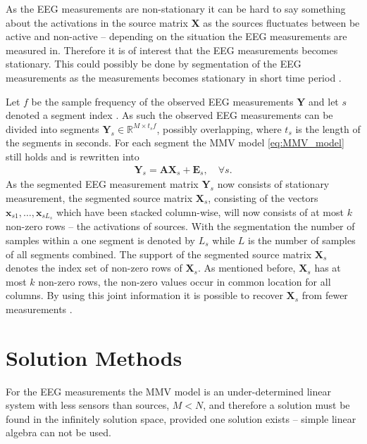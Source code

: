 As the EEG measurements are non-stationary it can be hard to say something about the activations in the source matrix $\mathbf{X}$ as the sources fluctuates between be active and non-active -- depending on the situation the EEG measurements are measured in.
Therefore it is of interest that the EEG measurements becomes stationary.
This could possibly be done by segmentation of the EEG measurements as the measurements becomes stationary in short time period .

Let $f$ be the sample frequency of the observed EEG measurements $\mathbf{Y}$ and let $s$ denoted a segment index .
As such the observed EEG measurements can be divided into segments $\mathbf{Y}_s \in \mathbb{R}^{M \times t_s f}$, possibly overlapping, where $t_s$ is the length of the segments in seconds. For each segment the MMV model \eqref{eq:MMV_model} still holds and is rewritten into
\begin{align}\label{eq:MMV_seg}
\mathbf{Y}_s = \mathbf{AX}_s + \textbf{E}_s, \quad \forall s.
\end{align}
As the segmented EEG measurement matrix $\mathbf{Y}_s$ now consists of stationary measurement, the segmented source matrix $\mathbf{X}_s$, consisting of the vectors $\mathbf{x}_{s1}, \dots, \mathbf{x}_{sL_s}$ which have been stacked column-wise, will now consists of at most $k$ non-zero rows -- the activations of sources. With the segmentation the number of samples within a one segment is denoted by $L_s$ while $L$ is the number of samples of all segments combined. 
The support of the segmented source matrix $\mathbf{X}_s$ denotes the index set of non-zero rows of $\mathbf{X}_s$. 
As mentioned before, $\mathbf{X}_s$ has at most $k$ non-zero rows, the non-zero values occur in common location for all columns. 
By using this joint information it is possible to recover $\mathbf{X}_s$ from fewer measurements \cite[p. 43]{CS}.

\section{Solution Methods}\label{sec:sol_met}
For the EEG measurements the MMV model is an under-determined linear system with less sensors than sources, $M < N$, and therefore a solution must be found in the infinitely solution space, provided one solution exists -- simple linear algebra can not be used.

